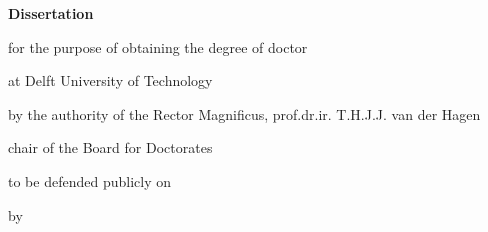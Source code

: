 \begin{titlepage}
%
%
%
%
%
%

\thispagestyle{empty}

\begin{center}


\vspace*{2\bigskipamount}

{\makeatletter
\titlestyle\bfseries\LARGE\@title
\par
\makeatother}

{\makeatletter
\ifx\@subtitle\undefined\else
    \bigskip
    \titlefont\titleshape\Large\@subtitle
\fi
\makeatother}

\vfill


{\Large\titlefont\bfseries Dissertation}

\bigskip
\bigskip

for the purpose of obtaining the degree of doctor

at Delft University of Technology

by the authority of the Rector Magnificus, prof.dr.ir. T.H.J.J. van der Hagen

chair of the Board for Doctorates

to be defended publicly on


\bigskip
\bigskip

by


\end{center}
\end{titlepage}
